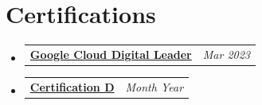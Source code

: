 \documentclass[a4paper,11pt]{article}
\makeatletter
\newcommand{\resumePOR}[3]{
\vspace{0.5mm}\item
    \begin{tabular*}{0.97\textwidth}[t]{l@{\extracolsep{\fill}}r}
        \textbf{#1}\hspace{0.3mm}#2 & \textit{\small{#3}} 
    \end{tabular*}
    \vspace{-2mm}
}
\newcommand{\resumeSubHeadingListStart}{\begin{itemize}[leftmargin=*,labelsep=1mm]}
\newcommand{\resumeSubHeadingListEnd}{\end{itemize}\vspace{2mm}}
\makeatother
\begin{document}
\section{\textbf{Certifications}}
\vspace{-0.2mm}
\resumeSubHeadingListStart
\resumePOR{}{
 \textbf{{\href{https://www.credential.net/1db83ee2-fd4c-4579-a4c2-408980f671c0\#acc.ACIF3Qml}{Google Cloud Digital Leader}}}}{Mar 2023}
\resumePOR{}{\href{https://certification-link-d.com}{
\textbf{Certification D}
}}{Month Year}
\resumeSubHeadingListEnd
\vspace{-6mm}
\end{document}
